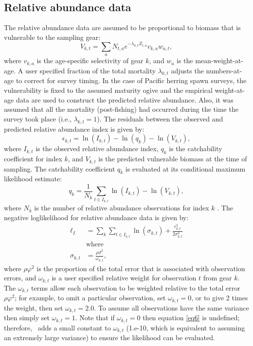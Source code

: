 \subsection{Relative abundance data}
The relative abundance data are assumed to be proportional to biomass that is vulnerable to the sampling gear:
\begin{equation}\label{eq4}
 V_{k,t} = \sum_a N_{t,a} e^{-\lambda_{k,t} Z_{t,a}} v_{k,a} w_{a,t},
\end{equation}
where $v_{k,a}$ is the age-specific selectivity of gear $k$, and $w_a$ is the mean-weight-at-age. A user specified fraction of the total mortality $\lambda_{k,t}$ adjusts the numbers-at-age to correct for survey timing.  In the case of Pacific herring spawn surveys, the vulnerability is fixed to the assumed maturity ogive and the empirical weight-at-age data are used to construct the predicted relative abundance.  Also, it was assumed that all the mortality (post-fishing) had occurred during the time the survey took place (i.e., $\lambda_{k,t}=1$).  The residuals between the observed and predicted relative abundance index is given by:
\begin{equation}\label{eq5}
\epsilon_{k,t} = \ln(I_{k,t}) - \ln(q_k) - \ln(V_{k,t}),
\end{equation}
where $I_{k,t}$ is the observed relative abundance index, $q_k$ is the catchability coefficient for index $k$, and $V_{k,t}$ is the predicted vulnerable biomass at the time of sampling.  The catchability coefficient $q_k$ is evaluated at its conditional maximum likelihood estimate:
\[
  q_k =\frac{1}{N_k} \sum_{t \in I_{k,t}} \ln(I_{k,t}) - \ln(V_{k,t}),
\]
where $N_k$ is the number of relative abundance observations for index $k$ \citep[see][for more information]{walters1994calculation}. The negative loglikelihood for relative abundance data is given by:
\begin{align}
\ell_I &= \sum_k \sum_{t \in I_{k,t}}  \ln(\sigma_{k,t})+\frac{\epsilon_{k,t}^2}{2\sigma_{k,t}^2} \label{eq6}\\
&\mbox{where}\nonumber\\
\sigma_{k,t} &= \frac{\rho \vartheta^2}{ \omega_{k,t}},  \nonumber
\end{align}
where $\rho \varphi^2$ is the proportion of the total error that is associated with observation errors, and $\omega_{k,t}$ is a user specified relative weight for observation $t$ from gear $k$.  The $ \omega_{k,t}$ terms allow each observation to be weighted relative to the total error $\rho \varphi^2$; for example, to omit a particular observation, set $\omega_{k,t}=0$, or to give 2 times the weight, then set  $\omega_{k,t}=2.0$. To assume all observations have the same variance then simply set  $\omega_{k,t}=1$.  Note that if  $\omega_{k,t}=0$ then equation \eqref{eq6} is undefined; therefore, \iscam\ adds a small constant to  $\omega_{k,t}$ (1.e-10, which is equivalent to assuming an extremely large variance)  to ensure the likelihood can be evaluated.

